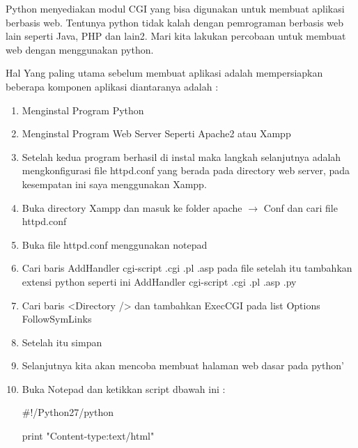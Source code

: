 \begin{enumerate}
\vspace{12pt}
Python menyediakan modul CGI yang bisa digunakan untuk membuat aplikasi berbasis web. Tentunya python tidak kalah dengan pemrograman berbasis web lain seperti Java, PHP dan lain2. Mari kita lakukan percobaan untuk membuat web dengan menggunakan python. \par
\noindent 
Hal Yang paling utama sebelum membuat aplikasi adalah mempersiapkan beberapa komponen aplikasi diantaranya adalah : \par
\noindent 
\begin{enumerate}
	\item Menginstal Program Python \par
	\noindent 
	\item Menginstal Program Web Server Seperti Apache2 atau Xampp \par
	\noindent 
	\item Setelah kedua program berhasil di instal maka langkah selanjutnya adalah mengkonfigurasi file httpd.conf yang berada pada directory web server, pada kesempatan ini saya menggunakan Xampp. \par
	\noindent 
	\item Buka directory Xampp dan masuk ke folder apache  $  \rightarrow  $ Conf dan cari file httpd.conf \par
	\noindent 
	\item Buka file httpd.conf menggunakan notepad \par
	\noindent 
	\item Cari baris AddHandler cgi-script .cgi .pl .asp pada file setelah itu tambahkan extensi python seperti ini AddHandler cgi-script .cgi .pl .asp .py \par
	\noindent 
	\item Cari baris <Directory /> dan tambahkan ExecCGI pada list Options FollowSymLinks \par
	\noindent 
	\item Setelah itu simpan \par
	\noindent 
	\item Selanjutnya kita akan mencoba membuat halaman web dasar pada python’ \par
	\noindent 
	\item Buka Notepad dan ketikkan script dbawah ini : \par
	\vspace{12pt}
	\noindent 
	$  \#  $!/Python27/python \par
	\noindent 
	print "Content-type:text/html" \par

\end{enumerate}
\end{enumerate}

